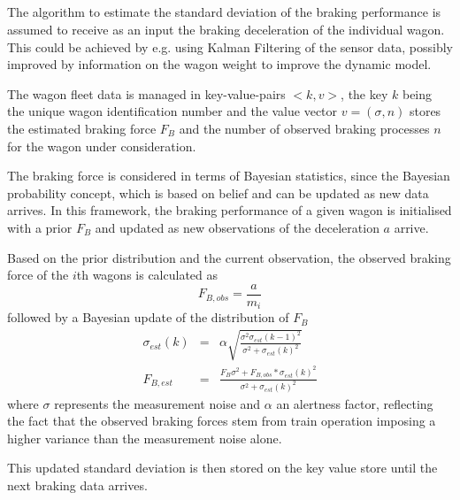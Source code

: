 \documentclass[a4paper, 12pt]{scrartcl}
\begin{document}
\subsection{}
The algorithm to estimate the standard deviation of the braking performance is assumed to receive as an input the braking deceleration of the individual wagon. This could be achieved by e.g. using Kalman Filtering of the sensor data, possibly improved by information on the wagon weight to improve the dynamic model.

The wagon fleet data is managed in key-value-pairs $<k, v>$, the key $k$ being the unique wagon identification number and the value vector $v = \left(\sigma, n\right)$ stores the estimated braking force $F_{B}$ and the number of observed braking processes $n$ for the wagon under consideration.

The braking force is considered in terms of Bayesian statistics, since the Bayesian probability concept, which is based on belief and can be updated as new data arrives. In this framework, the braking performance of a given wagon is initialised with a prior $F_{B}$ and updated as new observations of the deceleration $a$ arrive.

Based on the prior distribution and the current observation, the observed braking force of the $i$th wagons is calculated as 
\begin{equation}
F_{B, obs} =\frac{a}{m_{i}}
\end{equation}
followed by a Bayesian update of the distribution of $F_{B}$
\begin{eqnarray}
\sigma_{est}(k) &=& \alpha \sqrt{\frac{\sigma^2 \sigma_{est}(k-1)^2}{\sigma^2+\sigma_{est}(k)^2}}\\
F_{B,est} &=& \frac{F_{B} \sigma^2 + F_{B, obs}*\sigma_{est}(k)^2}{\sigma^2+\sigma_{est}(k)^2} 
\end{eqnarray}
where $\sigma$ represents the measurement noise and $\alpha$ an alertness factor, reflecting the fact that the observed braking forces stem from train operation imposing a higher variance than the measurement noise alone.

This updated standard deviation is then stored on the key value store until the next braking data arrives.
\end{document}
